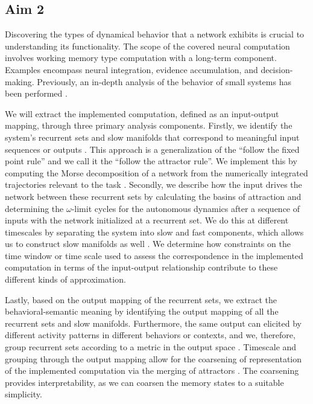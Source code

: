 \documentclass[12pt,letterpaper, onecolumn]{article}
\theoremstyle{definition}
\theoremstyle{remark}
\begin{document}
\subsection*{Aim 2}
Discovering the types of dynamical behavior that a network exhibits is crucial to understanding its functionality. The scope of the covered neural computation involves working memory type computation with a long-term component. Examples encompass neural integration, evidence accumulation, and decision-making.
Previously, an in-depth analysis of the behavior of small systems has been performed \citep{beer1995ctrnn, beer1995interaction, beer1995computational, beer2006, beer2023}. %


We will extract the implemented computation, defined as an input-output mapping, through three primary analysis components.
Firstly, we identify the system's recurrent sets and slow manifolds that correspond to meaningful input sequences or outputs \citep{goudar2018}. This approach is a generalization of the ``follow the fixed point rule'' and we call it the ``follow the attractor rule''. We implement this by computing the Morse decomposition of a network from the numerically integrated trajectories relevant to the task \citep{mischaikow1999, arai2009database}.
Secondly, we describe how the input drives the network between these recurrent sets by calculating the basins of attraction and determining the $\omega$-limit cycles for the autonomous dynamics after a sequence of inputs with the network initialized at a recurrent set. We do this at different timescales by separating the system into slow and fast components, which allows us to construct slow manifolds as well \citep{jones1995, kuehn2015, casey1996}.
We determine how constraints on the time window or time scale used to assess the correspondence in the implemented computation in terms of the input-output relationship contribute to these different kinds of approximation.


Lastly, based on the output mapping of the recurrent sets, we extract the behavioral-semantic meaning by identifying the output mapping of all the recurrent sets and slow manifolds. Furthermore, the same output can elicited by different activity patterns in different behaviors or contexts, and we, therefore, group recurrent sets according to a metric in the output space \citep{athalye2023, myers2022}.
Timescale and grouping through the output mapping allow for the coarsening of representation of the implemented computation via the merging of attractors \citep{braun2010}.
The coarsening provides interpretability, as we can coarsen the memory states to a suitable simplicity.
\end{document}
